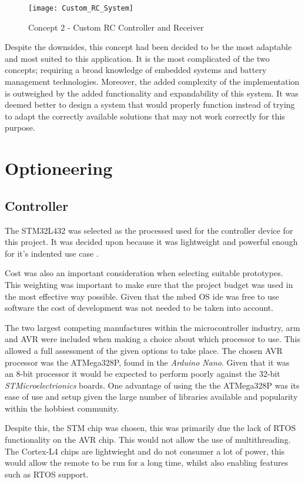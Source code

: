 \documentclass [12pt]{article}
\begin{document}
\begin{figure}[H]
\centerline{\texttt{[image: Custom\_RC\_System]}}
\caption{Concept 2 - Custom RC Controller and Receiver}
\label{fig:Custom_RC_System}
\end{figure} 

Despite the downsides, this concept had been decided to be the most adaptable and most suited to this application. It is the most complicated of the two concepts; requiring a broad knowledge of embedded systems and battery management technologies. Moreover, the added complexity of the implementation is outweighed by the added functionality and expandability of this system. It was deemed better to design a system that would properly function instead of trying to adapt the correctly available solutions that may not work correctly for this purpose.

\section{Optioneering}\label{sec:optioneering}
\subsection{Controller}

The STM32L432 was selected as the processed used for the controller device for this project. It was decided upon because it was lightweight and powerful enough for it's indented use case \cite{stm32l432KC}.
 
Cost was also an important consideration when selecting suitable prototypes. This weighting was important to make sure that the project budget was used in the most effective way possible. Given that the \gls{mbed} OS \gls{ide} was free to use software the cost of development was not needed to be taken into account. 

The two largest competing manufactures within the microcontroller industry, \gls{arm} and AVR were included when making a choice about which processor to use. This allowed a full assessment of the given options to take place. The chosen AVR processor was the ATMega328P, found in the \textit{Arduino Nano}. Given that it was an 8-bit processor it would be expected to perform poorly against the 32-bit \textit{STMicroelectrionics} boards. One advantage of using the the ATMega328P was its ease of use and setup given the large number of libraries available and popularity within the hobbiest community. 

Despite this, the STM chip was chosen, this was primarily due the lack of RTOS functionality on the AVR chip. This would not allow the use of multithreading. The Cortex-L4 chips are lightwieght and do not consumer a lot of power, this would allow the remote to be run for a long time, whilst also enabling features such as RTOS support. 
\end{document}
